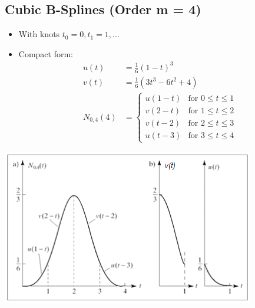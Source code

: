 \documentclass{article}
\begin{document}
\subsection*{Cubic B-Splines (Order m = 4)}
\begin{itemize}
    \item With knots $t_0 = 0, t_1 = 1, \dots$
    \item Compact form:
    \begin{align*}
        u(t) &= \frac{1}{6}(1 - t)^3\\
        v(t) &= \frac{1}{6}(3t^3 - 6t^2 + 4)\\
        N_{0, 4}(4) &= \begin{cases}u(1 - t) & \text{for } 0 \leq t \leq 1 \\ v(2 - t) & \text{for } 1\leq t \leq 2 \\ v(t - 2) & \text{for } 2 \leq t \leq 3 \\ u(t - 3) & \text{for } 3 \leq t \leq 4\end{cases}
    \end{align*}
\end{itemize}
\begin{center}
    \includegraphics*[scale=0.8]{W3_17.png}
\end{center}
\end{document}
